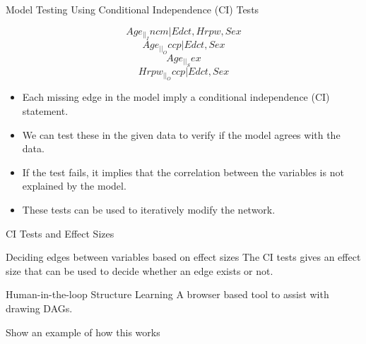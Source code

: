 \documentclass{beamer}
\begin{document}
\begin{frame}{Model Testing Using Conditional Independence (CI) Tests}
	\begin{figure}
		\begin{subfigure}{0.5 \textwidth}
			\centering
		\end{subfigure}
		\begin{subfigure}{0.5 \textwidth}
			\centering
			$$ Age _||_ Incm | Edct, Hrpw, Sex $$
			$$ Age _||_ Occp | Edct, Sex $$
			$$ Age _||_ Sex $$
			$$ Hrpw _||_ Occp | Edct, Sex $$
		\end{subfigure}

	\end{figure}

	\begin{itemize}
		\item Each missing edge in the model imply a conditional independence (CI) statement. 
		\item We can test these in the given data to verify if the model agrees with the data.
		\item If the test fails, it implies that the correlation between the variables is not explained by the model.
		\item These tests can be used to iteratively modify the network.
	\end{itemize}
\end{frame}

\begin{frame}{CI Tests and Effect Sizes}
\end{frame}

\begin{frame}{Deciding edges between variables based on effect sizes}
	The CI tests gives an effect size that can be used to decide whether an edge exists or not.

\end{frame}

\begin{frame}{Human-in-the-loop Structure Learning}
	A browser based tool to assist with drawing DAGs.
\end{frame}

\begin{frame}{Show an example of how this works}
\end{frame}
\end{document}
